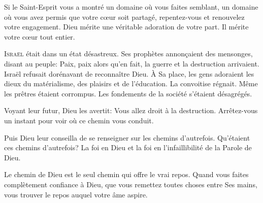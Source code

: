 Si le Saint-Esprit vous a montré un domaine où vous faites semblant,
 un domaine où vous avez permis que votre c\oe{}ur soit partagé,
 repentez-vous et renouvelez votre engagement. Dieu mérite une véritable
 adoration de votre part. Il mérite votre c\oe{}ur tout entier. 

\dvrule






\lettrine{I}{sraël} était dans un état désastreux.
 Ses prophètes annon\c{c}aient des mensonges, disant au peuple: 
 \Og Paix, paix \Fg{} alors qu'en fait, la guerre et la destruction arrivaient.
 Israël refusait dorénavant de reconnaître Dieu.
 À Sa place, les gens adoraient les dieux du matérialisme, des plaisirs
 et de l'éducation. La convoitise régnait.
 Même les prêtres étaient corrompus.
 Les fondements de la société s'étaient désagrégés. 

Voyant leur futur, Dieu les avertit:
 \Og Vous allez droit à la destruction.
 Arrêtez-vous un instant pour voir où ce chemin vous conduit. \Fg{}

Puis Dieu leur conseilla de
 \Og se renseigner sur les chemins d'autrefois. \Fg{}
 Qu'étaient ces chemins d'autrefois? La foi en Dieu et la foi
 en l'infaillibilité de la Parole de Dieu. 


Le chemin de Dieu est le seul chemin qui offre le vrai repos.
 Quand vous faites complètement confiance à Dieu,
 que vous remettez toutes choses entre Ses mains,
 vous trouver le repos auquel votre âme aspire. 

